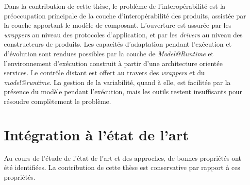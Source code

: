 Dans la contribution de cette thèse, le problème de l'interopérabilité est la préoccupation principale de la couche d'interopérabilité des produits, assistée par la couche apportant le modèle de composant. L'ouverture est assurée par les {\it wrappers} au niveau des protocoles d'application, et par les {\it drivers} au niveau des constructeurs de produits. Les capacités d'adaptation pendant l'exécution et d'évolution sont rendues possibles par la couche de \textit{Model@Runtime} et l'environnement d'exécution construit à partir d'une architecture orientée services. Le contrôle distant est offert au travers des {\it wrappers} et du \textit{model@runtime}. La gestion de la variabilité, quand à elle, est facilitée par la présence du modèle pendant l'exécution, mais les outils restent insuffisants pour résoudre complètement le problème.

\section{Intégration à l'état de l'art}

Au cours de l'étude de l'état de l'art et des approches, de bonnes propriétés ont été identifiées. La contribution de cette thèse est conservative par rapport à ces propriétés.\\


